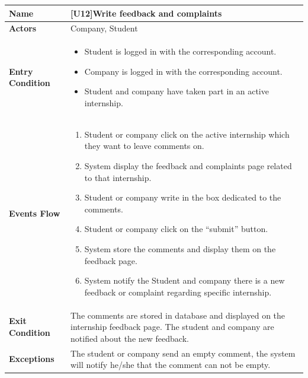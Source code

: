 \begin{center}
    \begin{tabular}{|p{9em}|p{27em}|}
        \hline
        \rowcolor{bluepoli!40} %
        \textbf{Name} & \textbf{[U12]Write feedback and complaints} \\
        \hline
        \textbf{Actors} & Company, Student\\
        \hline
        \textbf{Entry Condition} & 
        \begin{itemize}
            \item Student is logged in with the corresponding account.
            \item Company is logged in with the corresponding account.
            \item Student and company have taken part in an active internship.
        \end{itemize} \\
        \hline
        \textbf{Events Flow} & 
        \begin{enumerate}
            \item Student or company click on the active internship which they want to leave comments on.
            \item System display the feedback and complaints page related to that internship.
            \item Student or company write in the box dedicated to the comments.
            \item Student or company click on the ``submit'' button.
            \item System store the comments and display them on the feedback page.
            \item System notify the Student and company there is a new feedback or complaint regarding specific internship.
        \end{enumerate} \\
        \hline
        \textbf{Exit Condition} & 
         The comments are stored in database and displayed on the internship feedback page. The student and company are notified about the new feedback.\\
        \hline
        \textbf{Exceptions} &
        The student or company send an empty comment, the system will notify he/she that the comment can not be empty.\\
        \hline
    \end{tabular}
\end{center}

